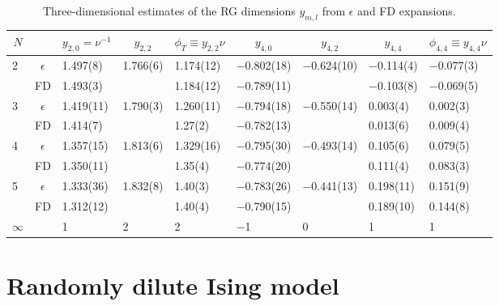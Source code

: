 \documentclass[a4paper,12pt]{article}
\begin{document}
\begin{table*}
\caption{
Three-dimensional estimates of the RG dimensions $y_{m,l}$
from $\epsilon$ and  FD expansions.
}
\label{ONstab}
\footnotesize
\begin{center}
\begin{tabular}{lclllllll}
\hline
\multicolumn{1}{c}{$N$}&
\multicolumn{1}{c}{}&
\multicolumn{1}{c}{$y_{2,0}=\nu^{-1}$}&
\multicolumn{1}{c}{$y_{2,2}$}&
\multicolumn{1}{c}{$\phi_T\equiv y_{2,2}\nu$}&
\multicolumn{1}{c}{$y_{4,0}$}&
\multicolumn{1}{c}{$y_{4,2}$}&
\multicolumn{1}{c}{$y_{4,4}$}&
\multicolumn{1}{c}{$\phi_{4,4}\equiv y_{4,4}\nu$}\\
\hline
2 &$\epsilon$ & 1.497(8) & 1.766(6) & 1.174(12)    & $-$0.802(18) & $-$0.624(10) &$-$0.114(4) &$-$0.077(3)\\
  & FD        & 1.493(3) &          & 1.184(12)    & $-$0.789(11) &              & $-$0.103(8)&$-$0.069(5) \\ \hline

3 &$\epsilon$ & 1.419(11)& 1.790(3) & 1.260(11)& $-$0.794(18) & $-$0.550(14) & 0.003(4)& 0.002(3) \\ 
  & FD        & 1.414(7) &          & 1.27(2)  & $-$0.782(13) & &  0.013(6)& 0.009(4) \\ \hline

4&$\epsilon$  & 1.357(15)& 1.813(6) & 1.329(16)& $-$0.795(30) & $-$0.493(14) & 0.105(6)& 0.079(5) \\ 
& FD          & 1.350(11)&          & 1.35(4) & $-$0.774(20) & & 0.111(4)& 0.083(3)  \\ \hline

5  &$\epsilon$ & 1.333(36) & 1.832(8) & 1.40(3) & $-$0.783(26) & $-$0.441(13) & 0.198(11) &  0.151(9) \\ 
& FD & 1.312(12) & & 1.40(4) & $-$0.790(15) & &  0.189(10)& 0.144(8)  \\ \hline

$\infty$ & & 1 & 2 & 2 & $-$1 & 0 & 1 & 1 \\
\hline
\end{tabular}
\end{center}
\end{table*}


\section{Randomly dilute Ising model}
\label{random}
\end{document}
